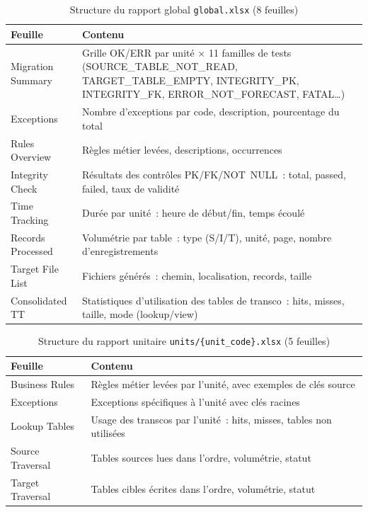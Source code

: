 \begin{table}[H]
\centering
\caption{Structure du rapport global \texttt{global.xlsx} (8 feuilles)}
\label{tab:global-xlsx}
\begin{tabularx}{\textwidth}{lX}
\toprule
\textbf{Feuille} & \textbf{Contenu} \\
\midrule
Migration Summary & Grille OK/ERR par unité × 11 familles de tests (SOURCE\_TABLE\_NOT\_READ, TARGET\_TABLE\_EMPTY, INTEGRITY\_PK, INTEGRITY\_FK, ERROR\_NOT\_FORECAST, FATAL\ldots) \\
\addlinespace
Exceptions & Nombre d'exceptions par code, description, pourcentage du total \\
\addlinespace
Rules Overview & Règles métier levées, descriptions, occurrences \\
\addlinespace
Integrity Check & Résultats des contrôles PK/FK/NOT~NULL~: total, passed, failed, taux de validité \\
\addlinespace
Time Tracking & Durée par unité~: heure de début/fin, temps écoulé \\
\addlinespace
Records Processed & Volumétrie par table~: type (S/I/T), unité, page, nombre d'enregistrements \\
\addlinespace
Target File List & Fichiers générés~: chemin, localisation, records, taille \\
\addlinespace
Consolidated TT & Statistiques d'utilisation des tables de transco~: hits, misses, taille, mode (lookup/view) \\
\bottomrule
\end{tabularx}
\end{table}

\begin{table}[H]
\centering
\caption{Structure du rapport unitaire \texttt{units/\{unit\_code\}.xlsx} (5 feuilles)}
\label{tab:unit-xlsx}
\begin{tabularx}{\textwidth}{lX}
\toprule
\textbf{Feuille} & \textbf{Contenu} \\
\midrule
Business Rules & Règles métier levées par l'unité, avec exemples de clés source \\
\addlinespace
Exceptions & Exceptions spécifiques à l'unité avec clés racines \\
\addlinespace
Lookup Tables & Usage des transcos par l'unité~: hits, misses, tables non utilisées \\
\addlinespace
Source Traversal & Tables sources lues dans l'ordre, volumétrie, statut \\
\addlinespace
Target Traversal & Tables cibles écrites dans l'ordre, volumétrie, statut \\
\bottomrule
\end{tabularx}
\end{table}

